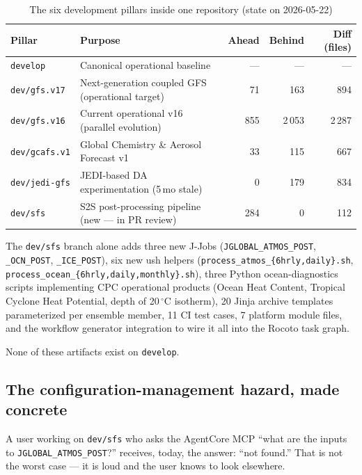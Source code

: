 \documentclass[11pt,letterpaper]{article}
\begin{document}
\begin{table}[H]
\centering
\caption{The six development pillars inside one repository (state on 2026-05-22)}
\label{tab:pillars}
\small
\begin{tabularx}{\textwidth}{lXrrr}
\toprule
\textbf{Pillar} & \textbf{Purpose} & \textbf{Ahead} & \textbf{Behind} & \textbf{Diff (files)} \\
\midrule
\texttt{develop} & Canonical operational baseline & --- & --- & --- \\
\texttt{dev/gfs.v17} & Next-generation coupled GFS (operational target) & 71 & 163 & 894 \\
\texttt{dev/gfs.v16} & Current operational v16 (parallel evolution) & 855 & 2\,053 & 2\,287 \\
\texttt{dev/gcafs.v1} & Global Chemistry \& Aerosol Forecast v1 & 33 & 115 & 667 \\
\texttt{dev/jedi-gfs} & JEDI-based DA experimentation (5\,mo stale) & 0 & 179 & 834 \\
\texttt{dev/sfs} & S2S post-processing pipeline (new --- in PR review) & 284 & 0 & 112 \\
\bottomrule
\end{tabularx}
\end{table}

The \texttt{dev/sfs} branch alone adds three new J-Jobs
(\texttt{JGLOBAL\_ATMOS\_POST}, \texttt{\_OCN\_POST}, \texttt{\_ICE\_POST}),
six new ush helpers (\texttt{process\_atmos\_\{6hrly,daily\}.sh},
\texttt{process\_ocean\_\{6hrly,daily,monthly\}.sh}), three Python
ocean-diagnostics scripts implementing CPC operational products
(Ocean Heat Content, Tropical Cyclone Heat Potential, depth of 20\,$^\circ$C
isotherm), 20 Jinja archive templates parameterized per ensemble
member, 11 CI test cases, 7 platform module files, and the workflow
generator integration to wire it all into the Rocoto task graph.

None of these artifacts exist on \texttt{develop}.

\subsection{The configuration-management hazard, made concrete}

A user working on \texttt{dev/sfs} who asks the AgentCore MCP
``what are the inputs to \texttt{JGLOBAL\_ATMOS\_POST}?'' receives,
today, the answer: ``not found.'' That is not the worst case --- it is
loud and the user knows to look elsewhere.
\end{document}
